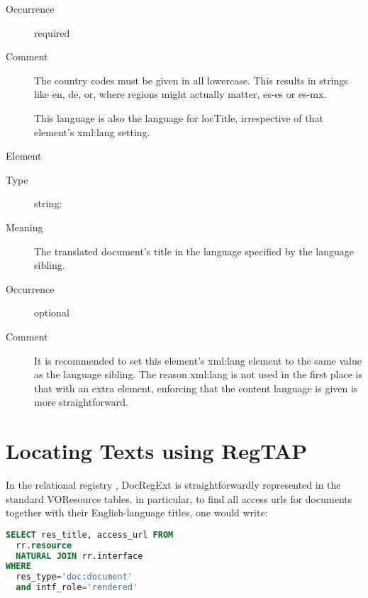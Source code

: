\documentclass{ivoa}
\begin{document}
\begin{generated}
\begin{bigdescription}
\begin{description}
\item[Occurrence] required
\item[Comment]
                The country codes must be given in all lowercase.  This
                results in strings like en, de, or, where regions
                might actually matter, es-es or es-mx.

                This language is also the language for locTitle,
                irrespective of that element's xml:lang setting.


\end{description}
\item[Element \xmlel{locTitle}]
\begin{description}
\item[Type] string: 
\item[Meaning]
              	The translated document's title in the language specified
              	by the language sibling.
            	
\item[Occurrence] optional
\item[Comment]
              	It is recommended to set this element's xml:lang element
              	to the same value as the language sibling.  The reason
              	xml:lang is not used in the first place is that with an
              	extra element, enforcing that the content language is
              	given is more straightforward.


\end{description}


\end{bigdescription}\endgroup

\endgroup
\end{generated}


\section{Locating Texts using RegTAP}
\label{sect:docregext-regtap}

In the relational registry \citep{2014ivoa.spec.1208D}, DocRegExt is
straightforwardly represented in the standard VOResource tables.  in
particular, to find all access urls for documents together with their
English-language titles, one would write:

\begin{lstlisting}[language=SQL]
SELECT res_title, access_url FROM
  rr.resource
  NATURAL JOIN rr.interface
WHERE
  res_type='doc:document'
  and intf_role='rendered'
\end{lstlisting}
\end{document}
